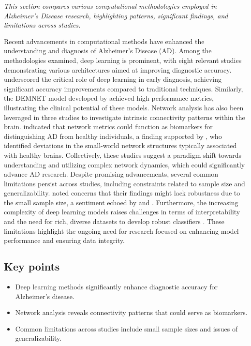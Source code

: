 \documentclass{MITcsail}
\begin{document}
\textit{This section compares various computational methodologies employed in Alzheimer's Disease research, highlighting patterns, significant findings, and limitations across studies.}

Recent advancements in computational methods have enhanced the understanding and diagnosis of Alzheimer's Disease (AD). Among the methodologies examined, deep learning is prominent, with eight relevant studies demonstrating various architectures aimed at improving diagnostic accuracy. \citet{ref_10_1109_isbi_2014_6868045} underscored the critical role of deep learning in early diagnosis, achieving significant accuracy improvements compared to traditional techniques. Similarly, the DEMNET model developed by \citet{ref_10_1109_access_2021_3090474} achieved high performance metrics, illustrating the clinical potential of these models. Network analysis has also been leveraged in three studies to investigate intrinsic connectivity patterns within the brain. \citet{ref_10_1371_journal_pcbi_1000100} indicated that network metrics could function as biomarkers for distinguishing AD from healthy individuals, a finding supported by \citet{ref_10_1186_1471_2202_10_101}, who identified deviations in the small-world network structures typically associated with healthy brains. Collectively, these studies suggest a paradigm shift towards understanding and utilizing complex network dynamics, which could significantly advance AD research. Despite promising advancements, several common limitations persist across studies, including constraints related to sample size and generalizability. \citet{ref_10_1523_jneurosci_2250_06_2006} noted concerns that their findings might lack robustness due to the small sample size, a sentiment echoed by \citet{ref_10_1371_journal_pcbi_1000100} and \citet{ref_10_1111_jon_12214}. Furthermore, the increasing complexity of deep learning models raises challenges in terms of interpretability and the need for rich, diverse datasets to develop robust classifiers \citep{ref_10_1002_alz_13390}. These limitations highlight the ongoing need for research focused on enhancing model performance and ensuring data integrity.

\subsection*{Key points}
\begin{itemize}
  \item Deep learning methods significantly enhance diagnostic accuracy for Alzheimer's disease.
  \item Network analysis reveals connectivity patterns that could serve as biomarkers.
  \item Common limitations across studies include small sample sizes and issues of generalizability.
\end{itemize}
\end{document}
